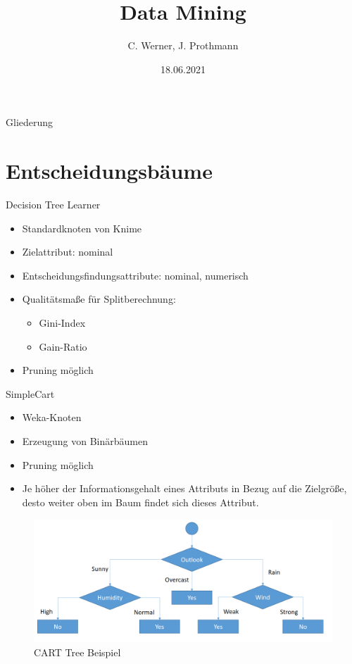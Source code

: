 \documentclass[
	handout,
  	aspectratio=169
]{beamer}
\title[Semesterprojekt KNIME]{Data Mining}
\date{18.06.2021}
\author[C. Werner, J. Prothmann]{C. Werner, J. Prothmann}
\institute{Bereich Elektrotechnik und Informatik}
\begin{document}
	\begin{frame}[plain]
		\titlepage
	\end{frame}

	\begin{frame}[allowframebreaks]{Gliederung}
		\tableofcontents
	\end{frame}
		
	\section{Entscheidungsbäume}
	
		\begin{frame}{Decision Tree Learner}
			\begin{itemize}
				\item Standardknoten von Knime
				\item Zielattribut: nominal
				\item Entscheidungsfindungsattribute: nominal, numerisch
				\item Qualitätsmaße für Splitberechnung:
				\begin{itemize}
					\item Gini-Index
					\item Gain-Ratio
				\end{itemize}
				\item Pruning möglich
			\end{itemize}
		\end{frame}

		\begin{frame}{SimpleCart}	
			\begin{itemize}
				\item Weka-Knoten
				\item Erzeugung von Binärbäumen
				\item Pruning möglich
				\item Je höher der Informationsgehalt eines Attributs in Bezug auf die Zielgröße, desto weiter oben im Baum findet
sich dieses Attribut. 
			\end{itemize}
			\begin{center}
				\begin{figure}[h]
					\includegraphics[scale=0.2]{../pictures/cart-tree.png}
					\caption{CART Tree Beispiel}		
				\end{figure}		
			\end{center}
		\end{frame}
\end{document}
